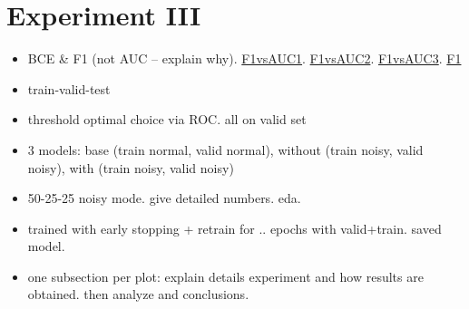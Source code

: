 \section{Experiment III}

\begin{itemize}
\item BCE \& F1 (not AUC -- explain why). \href{https://stats.stackexchange.com/questions/210700/how-to-choose-between-roc-auc-and-f1-score}{F1vsAUC1}. \href{https://www.quora.com/What-does-it-mean-to-have-high-AUC-but-low-F1-score}{F1vsAUC2}. \href{https://stackoverflow.com/questions/44172162/f1-score-vs-roc-auc}{F1vsAUC3}. \href{https://www.mikulskibartosz.name/f1-score-explained/}{F1}
\item train-valid-test
\item threshold optimal choice via ROC. all on valid set
\item 3 models: base (train normal, valid normal), without (train noisy, valid noisy), with (train noisy, valid noisy)
\item 50-25-25 noisy mode. give detailed numbers. eda.
\item trained with early stopping + retrain for .. epochs with valid+train. saved model.
\item one subsection per plot: explain details experiment and how results are obtained. then analyze and conclusions.
\end{itemize}

%




